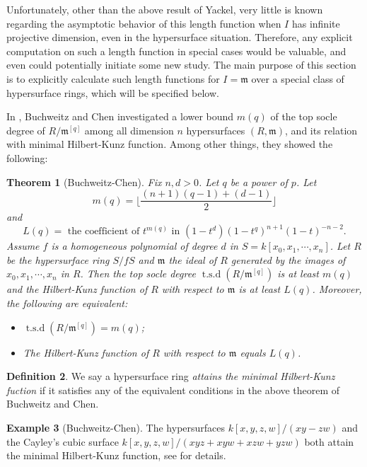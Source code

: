 \documentclass[draft]{amsart}
\newtheorem{theorem}{Theorem}[section]
\theoremstyle{definition}
\newtheorem{definition}[theorem]{Definition}
\newtheorem{ex}[theorem]{Example}
\numberwithin{equation}{theorem}
\begin{document}
Unfortunately, other than the above result of Yackel, very little is known regarding the asymptotic behavior of this length function when $I$ has infinite projective dimension, even in the hypersurface situation. Therefore, any explicit computation on such a length function in special cases would be valuable, and even could potentially initiate some new study. The main purpose of this section is to explicitly calculate such length functions for $I={\mathfrak{m}}$ over a special class of hypersurface rings, which will be specified below. 

In \cite{BC}, Buchweitz and Chen investigated a lower bound $m(q)$ of the top socle degree of $R/{\mathfrak{m}}^{[q]}$ among all dimension $n$ hypersurfaces $(R, {\mathfrak{m}})$, and its relation with minimal Hilbert-Kunz function. Among other things, they showed the following:

\begin{theorem}[Buchweitz-Chen]\label{BC} Fix $n, d>0$. Let $q$ be a power of $p$. Let 
\[m(q)=\bigg\lfloor \dfrac{(n+1)(q-1)+(d-1)}{2}\bigg \rfloor\]  
and \[L(q)= \text{ the coefficient of } t^{m(q)} \text{ in } (1-t^d)(1-t^q)^{n+1}(1-t)^{-n-2}.\]
Assume $f$ is a homogeneous polynomial of degree $d$ in $S=k[x_0,x_1, \cdots, x_n]$. Let $R$ be the hypersurface ring $S/fS$ and ${\mathfrak{m}}$ the ideal of $R$ generated by the images of $x_0, x_1, \cdots, x_n$ in $R$. Then the top socle degree ${\operatorname{t.s.d}} (R/{\mathfrak{m}}^{[q]})$ is at least $m(q)$ and the Hilbert-Kunz function of $R$ with respect to ${\mathfrak{m}}$ is at least $L(q)$. Moreover, the following are equivalent:
\begin{itemize}
\item[(1)] ${\operatorname{t.s.d}} (R/{\mathfrak{m}}^{[q]})=m(q)$;
\item[(2)] The Hilbert-Kunz function of $R$ with respect to ${\mathfrak{m}}$ equals $L(q)$.
\end{itemize} 

\end{theorem} 

\begin{definition}\label{mHK}
We say a hypersurface ring \emph{attains the minimal Hilbert-Kunz fuction} if it satisfies any of the equivalent conditions in the above theorem of Buchweitz and Chen.
\end{definition}

\begin{ex}[Buchweitz-Chen] The hypersurfaces $k[x,y,z,w]/(xy-zw)$ and the Cayley's cubic surface $k[x,y,z,w]/(xyz+xyw+xzw+yzw)$ both attain the minimal Hilbert-Kunz function, see \cite{BC} for details.
\end{ex}
\end{document}
